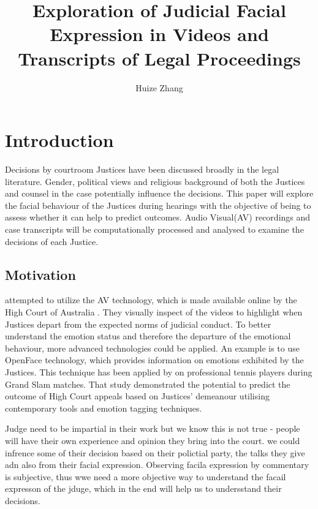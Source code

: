 \documentclass{monashthesis}
\author{Huize Zhang}
\title{Exploration of Judicial Facial Expression in Videos and Transcripts of Legal Proceedings}
\begin{document}

\titlepage

{\sf\tighttoc\doublespacing}

\clearpage{}\setcounter{page}{0}

\hypertarget{ch:intro}{%
\chapter{Introduction}\label{ch:intro}}

Decisions by courtroom Justices have been discussed broadly in the legal literature. Gender, political views and religious background of both the Justices and counsel in the case potentially influence the decisions. This paper will explore the facial behaviour of the Justices during hearings with the objective of being to assess whether it can help to predict outcomes. Audio Visual(AV) recordings and case transcripts will be computationally processed and analysed to examine the decisions of each Justice.

\hypertarget{motivation}{%
\section{Motivation}\label{motivation}}

\textcite{tutton2018judicial} attempted to utilize the AV technology, which is made available online by the High Court of Australia \autocite{highcourtau}. They visually inspect of the videos to highlight when Justices depart from the expected norms of judicial conduct. To better understand the emotion status and therefore the departure of the emotional behaviour, more advanced technologies could be applied. An example is to use OpenFace \autocite*{baltrusaitis2018openface} technology, which provides information on emotions exhibited by the Justices. This technique has been applied by \textcite{kovalchik2018going} on professional tennis players during Grand Slam matches. That study demonstrated the potential to predict the outcome of High Court appeals based on Justices' demeanour utilising contemporary tools and emotion tagging techniques.

Judge need to be impartial in their work but we know this is not true - people will have their own experience and opinion they bring into the court. we could infrence some of their decision based on their polictial party, the talks they give adn also from their facial expression. Observing facila expression by commentary is subjective, thus wwe need a more objective way to understand the facail expresson of the jduge, which in the end will help us to undersstand their decisions.
\end{document}
